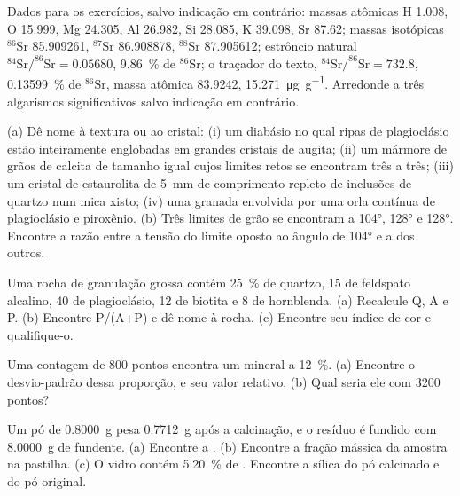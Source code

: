 Dados para os exercícios, salvo indicação em contrário: massas atômicas H 1.008, O 15.999, Mg 24.305, Al
26.982, Si 28.085, K 39.098, Sr 87.62; massas isotópicas $^{86}\mathrm{Sr}$ 85.909261,
$^{87}\mathrm{Sr}$ 86.908878, $^{88}\mathrm{Sr}$ 87.905612; estrôncio natural
$^{84}\mathrm{Sr}/^{86}\mathrm{Sr} = 0.05680$, \qty{9.86}{\percent} de $^{86}\mathrm{Sr}$; o traçador
do texto, $^{84}\mathrm{Sr}/^{86}\mathrm{Sr} = 732.8$, \qty{0.13599}{\percent} de
$^{86}\mathrm{Sr}$, massa atômica 83.9242, \qty{15.271}{\micro\gram\per\gram}. Arredonde a três
algarismos significativos salvo indicação em contrário.

\begin{exercise}[$\star$]\label{exo:b2:field-lab-methods-2:1}
(a) Dê nome à textura ou ao cristal: (i) um diabásio no qual ripas de plagioclásio estão inteiramente englobadas em
grandes cristais de augita; (ii) um mármore de grãos de calcita de tamanho igual cujos limites retos se encontram
três a três; (iii) um cristal de estaurolita de \qty{5}{mm} de comprimento repleto de inclusões de quartzo num mica xisto;
(iv) uma granada envolvida por uma orla contínua de plagioclásio e piroxênio. (b) Três limites de grão
se encontram a \ang{104}, \ang{128} e \ang{128}. Encontre a razão entre a tensão do limite oposto
ao ângulo de \ang{104} e a dos outros.
\end{exercise}

\begin{exercise}[$\star$]\label{exo:b2:field-lab-methods-2:2}
Uma rocha de granulação grossa contém \qty{25}{\percent} de quartzo, 15 de feldspato alcalino, 40 de plagioclásio, 12 de
biotita e 8 de hornblenda. (a) Recalcule Q, A e P. (b) Encontre P/(A+P) e dê nome à rocha. (c) Encontre
seu índice de cor e qualifique-o.
\end{exercise}

\begin{exercise}[$\star$]\label{exo:b2:field-lab-methods-2:3}
Uma contagem de 800 pontos encontra um mineral a \qty{12}{\percent}. (a) Encontre o desvio-padrão dessa
proporção, e seu valor relativo. (b) Qual seria ele com 3200 pontos?
\end{exercise}

\begin{exercise}[$\star$]\label{exo:b2:field-lab-methods-2:4}
Um pó de \qty{0.8000}{g} pesa \qty{0.7712}{g} após a calcinação, e o resíduo é fundido com
\qty{8.0000}{g} de fundente. (a) Encontre a . (b) Encontre a fração mássica da amostra na
pastilha. (c) O vidro contém \qty{5.20}{\percent} de . Encontre a sílica do pó calcinado
e do pó original.
\end{exercise}

